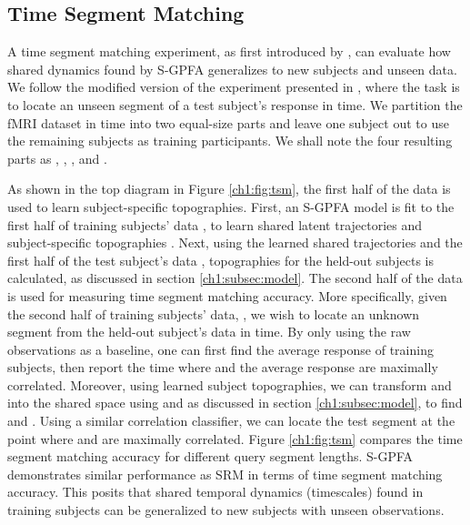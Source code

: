 \subsection{Time Segment Matching}
A time segment matching experiment, as first introduced by \cite{ha}, can evaluate how shared dynamics found by S-GPFA generalizes to new subjects and unseen data. We follow the modified version of the experiment presented in \cite{srm}, where the task is to locate an unseen segment of a test subject's response in time. We partition the fMRI dataset in time into two equal-size parts and leave one subject out to use the remaining subjects as training participants. We shall note the four resulting parts as , , , and .

As shown in the top diagram in Figure \ref{ch1:fig:tsm}, the first half of the data is used to learn subject-specific topographies. First, an S-GPFA model is fit to the first half of training subjects' data , to learn shared latent trajectories  and subject-specific topographies \wtrain. Next, using the learned shared trajectories  and the first half of the test subject's data , topographies for the held-out subjects \wtest is calculated, as discussed in section \ref{ch1:subsec:model}. The second half of the data is used for measuring time segment matching accuracy. More specifically, given the second half of training subjects' data, , we wish to locate an unknown segment from the held-out subject's data \yseg in time. By only using the raw observations as a baseline, one can first find the average response of training subjects, then report the time where \yseg and the average response are maximally correlated. Moreover, using learned subject topographies, we can transform  and \yseg into the shared space using \wtrain and \wtest as discussed in section \ref{ch1:subsec:model}, to find  and \xseg. Using a similar correlation classifier, we can locate the test segment at the point where  and \xseg are maximally correlated. Figure \ref{ch1:fig:tsm} compares the time segment matching accuracy for different query segment lengths. S-GPFA demonstrates similar performance as SRM in terms of time segment matching accuracy. This posits that shared temporal dynamics (timescales) found in training subjects can be generalized to new subjects with unseen observations. 

